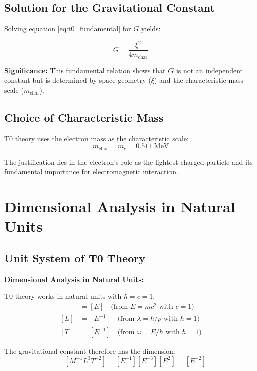 	\subsection{Solution for the Gravitational Constant}
	
	Solving equation \eqref{eq:t0_fundamental} for $G$ yields:
	
	\begin{equation}
		G = \frac{\xi^2}{4 m_{\text{char}}}
		\label{eq:g_fundamental}
	\end{equation}
	
	\textbf{Significance:} This fundamental relation shows that $G$ is not an independent constant but is determined by space geometry ($\xi$) and the characteristic mass scale ($m_{\text{char}}$).
	
	\subsection{Choice of Characteristic Mass}
	
	T0 theory uses the electron mass as the characteristic scale:
	\begin{equation}
		m_{\text{char}} = m_e = 0.511 \text{ MeV}
		\label{eq:characteristic_mass}
	\end{equation}
	
	The justification lies in the electron's role as the lightest charged particle and its fundamental importance for electromagnetic interaction.
	
	\section{Dimensional Analysis in Natural Units}
	
	\subsection{Unit System of T0 Theory}
	
	\begin{dimensional}
		\textbf{Dimensional Analysis in Natural Units:}
		
		T0 theory works in natural units with $\hbar = c = 1$:
		\begin{align}
			[M] &= [E] \quad \text{(from } E = mc^2 \text{ with } c = 1\text{)} \\
			[L] &= [E^{-1}] \quad \text{(from } \lambda = \hbar/p \text{ with } \hbar = 1\text{)} \\
			[T] &= [E^{-1}] \quad \text{(from } \omega = E/\hbar \text{ with } \hbar = 1\text{)}
		\end{align}
		
		The gravitational constant therefore has the dimension:
		\begin{equation}
			[G] = [M^{-1}L^3T^{-2}] = [E^{-1}][E^{-3}][E^2] = [E^{-2}]
		\end{equation}
	\end{dimensional}
	
